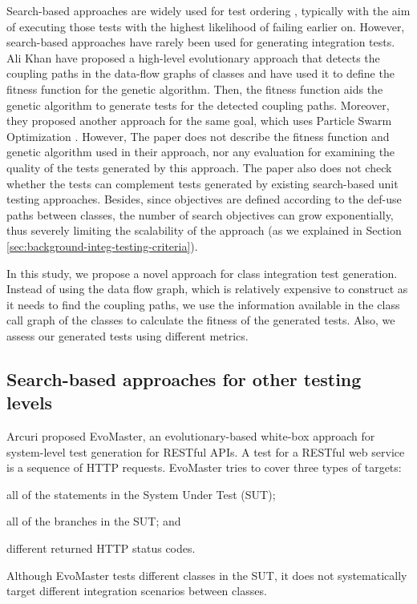 Search-based approaches are widely used for test ordering \cite{Wang2010, Steindl2012, Hashim2005, Vergilio2012, Bansal2009, JIiang2019, Borner2009, Mariani2016, Guizzo2015, Abdurazik2009, DaVeigaCabral2010, Briand2003a, Vergilio2012}, typically with the aim of executing those tests with the highest likelihood of failing earlier on. %
However, search-based approaches have rarely been used for generating integration tests. Ali Khan \etal \cite{AliKhan2013} have proposed a high-level evolutionary approach that detects the coupling paths in the data-flow graphs of classes and have used it to define the fitness function for the genetic algorithm. Then, the fitness function aids the genetic algorithm to generate tests for the detected coupling paths. Moreover, they proposed another approach for the same goal, which uses Particle Swarm Optimization \cite{Khan2014}. However, The paper does not describe the fitness function and genetic algorithm used in their approach, nor any evaluation for examining the quality of the tests generated by this approach. 
The paper also does not check whether the tests can complement tests generated by existing search-based unit testing approaches. Besides, since objectives are defined according to the def-use paths between classes, the number of search objectives can grow exponentially, thus severely limiting the scalability of the approach (as we explained in Section \ref{sec:background-integ-testing-criteria}).

In this study, we propose a novel approach for class integration test generation.
Instead of using the data flow graph, which is relatively expensive to construct as it needs to find the coupling paths, we use the information available in the class call graph of the classes to calculate the fitness of the generated tests. Also, we assess our generated tests using different metrics.

\subsection{Search-based approaches for other testing levels}

Arcuri \cite{Arcuri2019} proposed EvoMaster, an evolutionary-based white-box approach for system-level test generation for RESTful APIs. A test for a RESTful web service is a sequence of HTTP requests. EvoMaster tries to cover three types of targets:
 \begin{inparaenum}[(i)]
 \item all of the statements in the System Under Test (SUT);
 \item all of the branches in the SUT; and
\item different returned HTTP status codes.
\end{inparaenum}
Although EvoMaster tests different classes in the SUT, it does not systematically target different integration scenarios between classes.

